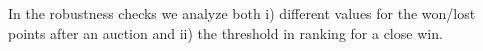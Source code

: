 In the robustness checks we analyze both i) different values for the won/lost points after an auction and ii) the threshold in ranking for a close win.

